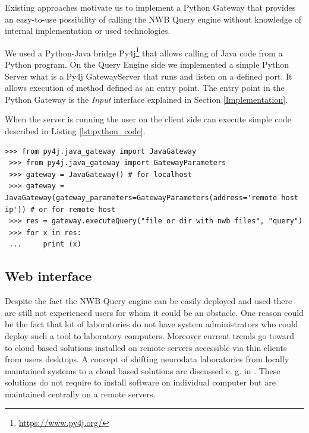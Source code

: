 \documentclass[utf8]{frontiersSCNS} %
\begin{document}
Existing approaches motivate us to implement a Python Gateway that provides an easy-to-use possibility of calling the NWB Query engine without knowledge of internal implementation or used technologies. 

We used a Python-Java bridge Py4j\footnote{\url{https://www.py4j.org/}} that allows calling of Java code from a Python program. On the Query Engine side we implemented a simple Python Server what is a Py4j GatewayServer that runs and listen on a defined port. It allows execution of method defined as an entry point. The entry point in the Python Gateway is the \emph{Input} interface explained in Section \ref{Implementation}. 

When the server is running the user on the client side can execute simple code described in Listing \ref{lst:python_code}.

\begin{lstlisting}[caption={\emph{Example of calling the python server.} In the first step a \emph{JavaGateway} library is imported. Once a Java Gateway is created the user can call the \emph{executeQuery} method with two parameters: (1) input file/dir and (2) required query. Next lines iterates over the result and print individual datasets},label={lst:python_code}]
 >>> from py4j.java_gateway import JavaGateway
 >>> from py4j.java_gateway import GatewayParameters
 >>> gateway = JavaGateway() # for localhost
 >>> gateway = JavaGateway(gateway_parameters=GatewayParameters(address='remote host ip')) # or for remote host
 >>> res = gateway.executeQuery("file or dir with nwb files", "query")
 >>> for x in res:
 ...     print (x)
\end{lstlisting}

\subsection{Web interface}
\label{web_interface}

Despite the fact the NWB Query engine can be easily deployed and used there are still not experienced users for whom it could be an obstacle. One reason could be the fact that lot of laboratories do not have system administrators who could deploy such a tool to laboratory computers. Moreover current trends go toward to cloud based solutions installed on remote servers accessible via thin clients from users desktops. A concept of shifting neurodata laboratories from locally maintained systems to a cloud based solutions are discussed e. g. in \citep{ROSENTHAL2010342}. These solutions do not require to install software on individual computer but are maintained centrally on a remote servers. 
\end{document}
